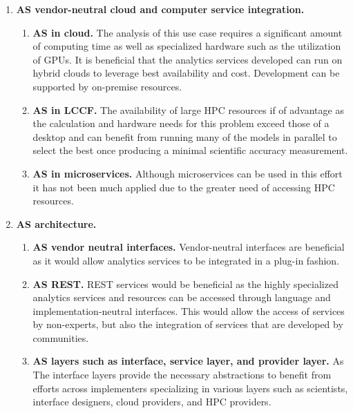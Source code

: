 \begin{enumerate}

\item{\bf AS vendor-neutral cloud and computer service integration.}

  \begin{enumerate}
  
  \item {\bf AS in cloud.} The analysis of this use case requires a significant amount of computing time as well as specialized hardware such as the utilization of GPUs. It is beneficial that the analytics services developed can run on hybrid clouds to leverage best availability and cost. Development can be supported by on-premise resources. 
  
  \item {\bf AS in LCCF.} The availability of large HPC resources if of advantage as the calculation and hardware needs for this problem exceed those of a desktop and can benefit from running many of the models in parallel to select the best once producing a minimal scientific accuracy measurement.
  
  \item {\bf AS in microservices.} Although microservices can be used in this effort it has not been much applied due to the greater need of accessing HPC resources.
  
  \end{enumerate}

\item{\bf AS architecture.}

  \begin{enumerate}
  
  \item{\bf AS vendor neutral interfaces.} Vendor-neutral interfaces are beneficial as it would allow analytics services to be integrated in a plug-in fashion.
  
  \item{\bf AS REST.} REST services would be beneficial as the highly specialized analytics services and resources can be accessed through language and implementation-neutral interfaces. This would allow the access of services by non-experts, but also the integration of services that are developed by communities.

  \item{\bf AS layers such as interface, service layer, and provider layer.} As The interface layers provide the necessary abstractions to benefit from efforts across implementers specializing in various layers such as scientists, interface designers, cloud providers, and HPC providers. 


\end{enumerate}
\end{enumerate}
